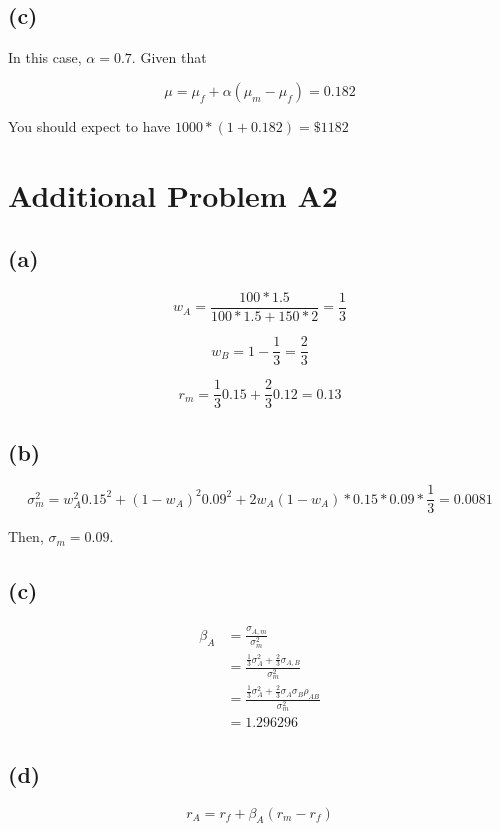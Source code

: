 \documentclass[11pt]{scrartcl}
\begin{document}
\subsection*{(c)}

In this case, $\alpha = 0.7$. Given that

\[\mu = \mu_f + \alpha(\mu_m - \mu_f) = 0.182\]

You should expect to have $1000 * (1+0.182) = \$1182$

\section*{Additional Problem A2}

\subsection*{(a)}

\[w_A = \frac{100*1.5}{100*1.5+150*2} = \frac{1}{3}\]

\[w_B = 1 - \frac{1}{3} = \frac{2}{3}\]

\[r_m = \frac{1}{3}0.15 + \frac{2}{3}0.12 = 0.13\]

\subsection*{(b)}

\[\sigma_m^2 = w_A^2 0.15^2 + (1-w_A)^2 0.09^2 + 2w_A(1-w_A)*0.15*0.09*\frac{1}{3} = 0.0081 \]

Then, $\sigma_m = 0.09$.

\subsection*{(c)}

\begin{align*}
\beta_A &= \frac{\sigma_{A,m}}{\sigma_m^2} \\
&= \frac{\frac{1}{3}\sigma_A^2 + \frac{2}{3}\sigma_{A,B}}{\sigma_m^2} \\
&= \frac{\frac{1}{3}\sigma_A^2 + \frac{2}{3}\sigma_A\sigma_B\rho_{AB}}{\sigma_m^2} \\
&= 1.296296
\end{align*}

\subsection*{(d)}

\[r_A = r_f + \beta_A (r_m - r_f)\]
\end{document}
